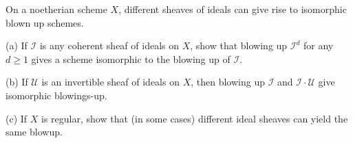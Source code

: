 On a noetherian scheme $X$, different sheaves of ideals can give rise to isomorphic blown up schemes.

(a) If $\mathcal{I}$ is any coherent sheaf of ideals on $X$, show that blowing up $\mathcal{I}^d$ for any $d \geqslant 1$ gives a scheme isomorphic to the blowing up of $\mathcal{I}$.

(b) If $\mathcal{U}$ is an invertible sheaf of ideals on $X$, then blowing up $\mathcal{I}$ and $\mathcal{I} \cdot \mathcal{U}$ give isomorphic blowings-up.

(c) If $X$ is regular, show that (in some cases) different ideal sheaves can yield the same blowup.
